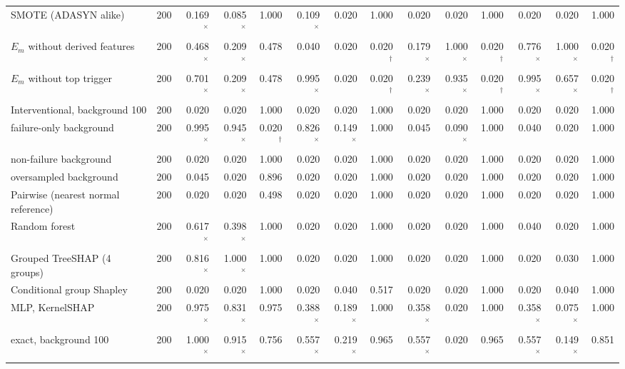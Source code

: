 \begin{tabular}{@{}lrrrrrrrrrrrrr@{}}
SMOTE (ADASYN alike) & 200 & 0.169$^{\times}$ & 0.085$^{\times}$ & 1.000 & 0.109$^{\times}$ & 0.020 & 1.000 & 0.020 & 0.020 & 1.000 & 0.020 & 0.020 & 1.000 \\
$E_m$ without derived features & 200 & 0.468$^{\times}$ & 0.209$^{\times}$ & 0.478 & 0.040 & 0.020 & 0.020$^{\dagger}$ & 0.179$^{\times}$ & 1.000$^{\times}$ & 0.020$^{\dagger}$ & 0.776$^{\times}$ & 1.000$^{\times}$ & 0.020$^{\dagger}$ \\
$E_m$ without top trigger & 200 & 0.701$^{\times}$ & 0.209$^{\times}$ & 0.478 & 0.995$^{\times}$ & 0.020 & 0.020$^{\dagger}$ & 0.239$^{\times}$ & 0.935$^{\times}$ & 0.020$^{\dagger}$ & 0.995$^{\times}$ & 0.657$^{\times}$ & 0.020$^{\dagger}$ \\
\addlinespace
Interventional, background 100 & 200 & 0.020 & 0.020 & 1.000 & 0.020 & 0.020 & 1.000 & 0.020 & 0.020 & 1.000 & 0.020 & 0.020 & 1.000 \\
\quad failure-only background & 200 & 0.995$^{\times}$ & 0.945$^{\times}$ & 0.020$^{\dagger}$ & 0.826$^{\times}$ & 0.149$^{\times}$ & 1.000 & 0.045 & 0.090$^{\times}$ & 1.000 & 0.040 & 0.020 & 1.000 \\
\quad non-failure background & 200 & 0.020 & 0.020 & 1.000 & 0.020 & 0.020 & 1.000 & 0.020 & 0.020 & 1.000 & 0.020 & 0.020 & 1.000 \\
\quad oversampled background & 200 & 0.045 & 0.020 & 0.896 & 0.020 & 0.020 & 1.000 & 0.020 & 0.020 & 1.000 & 0.020 & 0.020 & 1.000 \\
Pairwise (nearest normal reference) & 200 & 0.020 & 0.020 & 0.498 & 0.020 & 0.020 & 1.000 & 0.020 & 0.020 & 1.000 & 0.020 & 0.020 & 1.000 \\
Random forest & 200 & 0.617$^{\times}$ & 0.398$^{\times}$ & 1.000 & 0.020 & 0.020 & 1.000 & 0.020 & 0.020 & 1.000 & 0.040 & 0.020 & 1.000 \\
Grouped TreeSHAP (4 groups) & 200 & 0.816$^{\times}$ & 1.000$^{\times}$ & 1.000 & 0.020 & 0.020 & 1.000 & 0.020 & 0.020 & 1.000 & 0.020 & 0.030 & 1.000 \\
Conditional group Shapley & 200 & 0.020 & 0.020 & 1.000 & 0.020 & 0.040 & 0.517 & 0.020 & 0.020 & 1.000 & 0.020 & 0.040 & 1.000 \\
\addlinespace
MLP, KernelSHAP & 200 & 0.975$^{\times}$ & 0.831$^{\times}$ & 0.975 & 0.388$^{\times}$ & 0.189$^{\times}$ & 1.000 & 0.358$^{\times}$ & 0.020 & 1.000 & 0.358$^{\times}$ & 0.075$^{\times}$ & 1.000 \\
\quad exact, background 100 & 200 & 1.000$^{\times}$ & 0.915$^{\times}$ & 0.756 & 0.557$^{\times}$ & 0.219$^{\times}$ & 0.965 & 0.557$^{\times}$ & 0.020 & 0.965 & 0.557$^{\times}$ & 0.149$^{\times}$ & 0.851 \\

\end{tabular}
